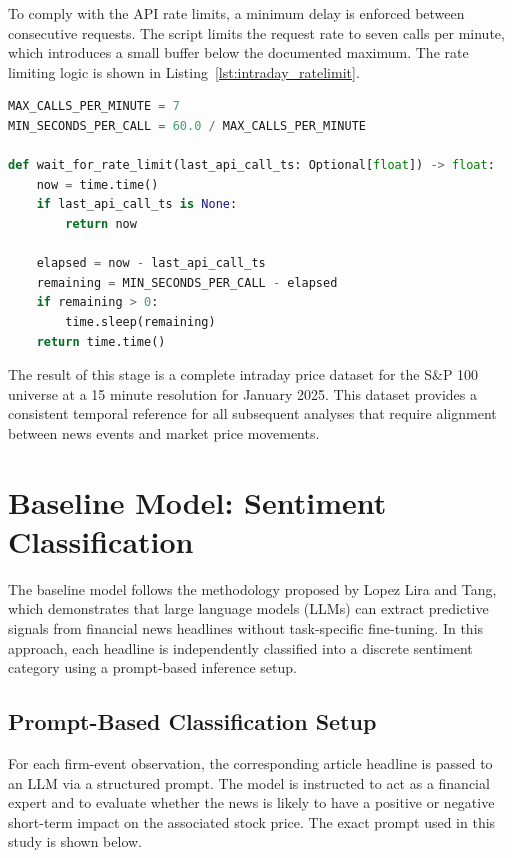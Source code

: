 To comply with the API rate limits, a minimum delay is enforced between consecutive requests. The script limits the request rate to seven calls per minute, which introduces a small buffer below the documented maximum. The rate limiting logic is shown in Listing~\ref{lst:intraday_ratelimit}.

\begin{lstlisting}[language=Python, caption={Rate limiting for API requests}, label={lst:intraday_ratelimit}]
MAX_CALLS_PER_MINUTE = 7
MIN_SECONDS_PER_CALL = 60.0 / MAX_CALLS_PER_MINUTE

def wait_for_rate_limit(last_api_call_ts: Optional[float]) -> float:
    now = time.time()
    if last_api_call_ts is None:
        return now

    elapsed = now - last_api_call_ts
    remaining = MIN_SECONDS_PER_CALL - elapsed
    if remaining > 0:
        time.sleep(remaining)
    return time.time()
\end{lstlisting}

The result of this stage is a complete intraday price dataset for the S\&P 100 universe at a 15 minute resolution for January 2025. This dataset provides a consistent temporal reference for all subsequent analyses that require alignment between news events and market price movements.

\section{Baseline Model: Sentiment Classification}

The baseline model follows the methodology proposed by Lopez Lira and Tang, which demonstrates that large language models (LLMs) can extract predictive signals from financial news headlines without task-specific fine-tuning. In this approach, each headline is independently classified into a discrete sentiment category using a prompt-based inference setup.

\subsection{Prompt-Based Classification Setup}

For each firm-event observation, the corresponding article headline is passed to an LLM via a structured prompt. The model is instructed to act as a financial expert and to evaluate whether the news is likely to have a positive or negative short-term impact on the associated stock price. The exact prompt used in this study is shown below.

